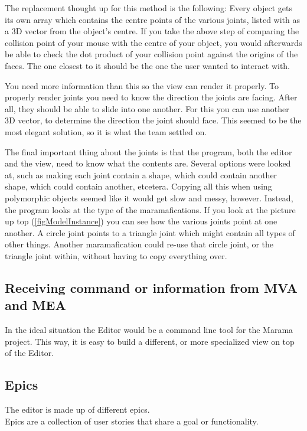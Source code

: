 \documentclass[10pt]{extarticle} %
\begin{document}
    The replacement thought up for this method is the following:
    Every object gets its own array which contains the centre points of the various joints, listed with as a 3D vector from the object's centre.
    If you take the above step of comparing the collision point of your mouse with the centre of your object, you would afterwards be able to check the dot product of your collision point against the origins of the faces.
    The one closest to it should be the one the user wanted to interact with.

    You need more information than this so the view can render it properly.
    To properly render joints you need to know the direction the joints are facing.
    After all, they should be able to slide into one another.
    For this you can use another 3D vector, to determine the direction the joint should face.
    This seemed to be the most elegant solution, so it is what the team settled on.

    The final important thing about the joints is that the program, both the editor and the view, need to know what the contents are.
    Several options were looked at, such as making each joint contain a shape, which could contain another shape, which could contain another, etcetera.
    Copying all this when using polymorphic objects seemed like it would get slow and messy, however.
    Instead, the program looks at the type of the maramafications.
    If you look at the picture up top (\ref{figModelInstance}) you can see how the various joints point at one another.
    A circle joint points to a triangle joint which might contain all types of other things.
    Another maramafication could re-use that circle joint, or the triangle joint within, without having to copy everything over.


    \subsection[Communication MVA-MEA]{Receiving command or information from MVA and MEA}
    \label{subsec:comchoice}
    In the ideal situation the Editor would be a command line tool for the Marama project.
    This way, it is easy to build a different, or more specialized view on top of the Editor.

    \subsection{Epics}
    \label{subsec:epics}
    The editor is made up of different epics.\\
    Epics are a collection of user stories that share a goal or functionality.
\end{document}
